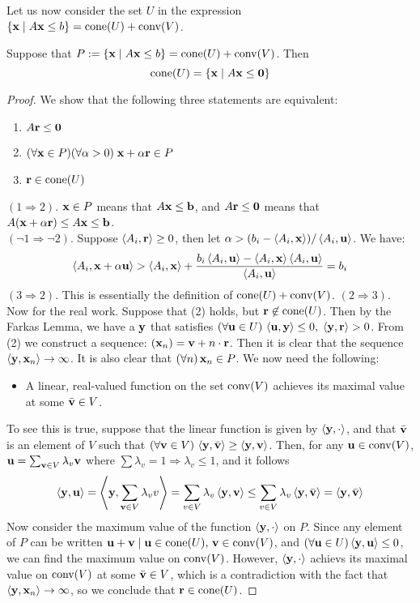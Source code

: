 Let us now consider the set $U$ in the expression $\HP{A}{b} = \cone(U) + \conv(V)$.
\begin{Prop}{\label{prop:ultz}
		Suppose that $P := \HP{A}{b} = \cone(U) + \conv(V)$.  Then
		\[ \cone(U) = \HC{A} \]
	} \end{Prop}
\begin{proof}
	We show that the following three statements are equivalent:
	\begin{enumerate}
		\item $A\r\leq\0$
		\item $(\forall \x\in P)(\forall \alpha > 0)\;\x + \alpha\r \in P$
		\item $\r \in \cone(U)$
	\end{enumerate}
	$(1 \Rightarrow 2)$. $\x\in P$ means that $A\x\leq\b$, and $A\r\leq\0$ means that $A(\x+\alpha\r) \leq A\x \leq \b$.\\
	$(\neg 1 \Rightarrow \neg 2)$.  Suppose $\ip{A_i}{\r} \geq 0$, then let $\alpha > (b_i - \ip{A_i}{\x})/\ip{A_i}{\u}$.  We have:
	\[ \ip{A_i}{\x + \alpha\u} > \ip{A_i}{\x} +
		\frac{b_i\ip{A_i}{\u} - \ip{A_i}{\x}\ip{A_i}{\u}}{\ip{A_i}{\u}} = b_i \]
	$(3 \Rightarrow 2)$.  This is essentially the definition of $\cone(U) + \conv(V)$.
	$(2 \Rightarrow 3)$.  Now for the real work.  Suppose that (2) holds, but $\r\not\in\cone(U)$.  Then by the Farkas Lemma, we have a $\y$ that satisfies $(\forall \u\in U)\,\ip{\u}{\y}\leq 0,\; \ip{\y}{\r} > 0$.  From (2) we construct a sequence: $(\x_n) = \v+n\cdot\r$.  Then it is clear that the sequence $\ip{\y}{\x_n} \to \infty$.  It is also clear that $(\forall n)\,\x_n \in P$.  We now need the following:
	\begin{itemize}
		\item A linear, real-valued function on the set $\conv(V)$ achieves its maximal value at some $\bar\v \in V$.
	\end{itemize}
	To see this is true, suppose that the linear function is given by $\ip{\y}{\cdot}$, and that $\bar\v$ is an element of $V$ such that $(\forall \v \in V)\,\ip{\y}{\bar\v} \geq \ip{\y}{\v}$.  Then, for any $\u \in \conv(V)$, $\u = \sum_{\v\in V} \lambda_v\v$ where $\sum \lambda_v = 1 \Rightarrow \lambda_v \leq 1$, and it follows
	\[\ip{\y}{\u} = \ip{\y}{\sum_{\v\in V}\lambda_v v} = \sum_{v\in V} \lambda_v\ip{\y}{\v}
		\leq \sum_{v\in V}\lambda_v\ip{\y}{\bar\v} = \ip{\y}{\bar\v} \]
	Now consider the maximum value of the function $\ip{\y}{\cdot}$ on $P$.  Since any element of $P$ can be written $\u + \v \st \u\in\cone(U),\,\v\in\conv(V)$, and $(\forall\u\in U) \ip{\y}{\u} \leq 0$, we can find the maximum value on $\conv(V)$.  However, $\ip{\y}{\cdot}$ achievs its maximal value on $\conv(V)$ at some $\bar\v\in V$, which is a contradiction with the fact that $\ip{\y}{\x_n} \to \infty$, so we conclude that $\r\in\cone(U)$.
\end{proof}

